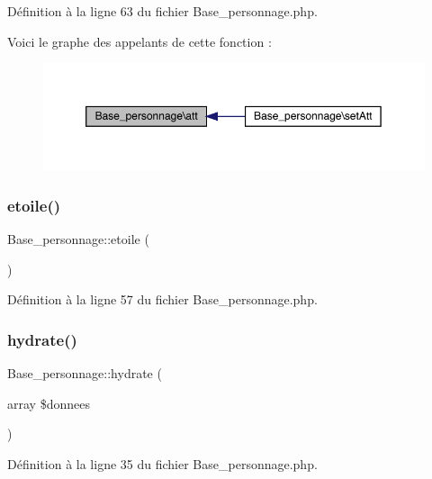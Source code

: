 Définition à la ligne 63 du fichier Base\+\_\+personnage.\+php.

Voici le graphe des appelants de cette fonction \+:\nopagebreak
\begin{figure}[H]
\begin{center}
\leavevmode
\includegraphics[width=350pt]{class_base__personnage_ad09642245bba8747d0ebd3ab991c66b9_icgraph}
\end{center}
\end{figure}
\mbox{\label{class_base__personnage_a17546eb34101fa1d501e84309f3f806c}} 
\subsubsection{\texorpdfstring{etoile()}{etoile()}}
{\footnotesize\ttfamily Base\+\_\+personnage\+::etoile (\begin{DoxyParamCaption}{ }\end{DoxyParamCaption})}



Définition à la ligne 57 du fichier Base\+\_\+personnage.\+php.

\mbox{\label{class_base__personnage_a100783dd2f191636d3eab860a60c18f6}} 
\subsubsection{\texorpdfstring{hydrate()}{hydrate()}}
{\footnotesize\ttfamily Base\+\_\+personnage\+::hydrate (\begin{DoxyParamCaption}\item[{array}]{\$donnees }\end{DoxyParamCaption})}



Définition à la ligne 35 du fichier Base\+\_\+personnage.\+php.


